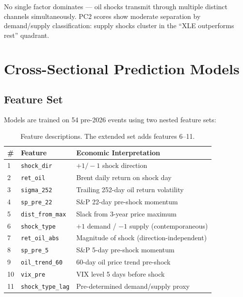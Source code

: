 \documentclass[11pt,a4paper]{article}
\begin{document}
No single factor dominates — oil shocks transmit through multiple distinct channels simultaneously. PC2 scores show moderate separation by demand/supply classification: supply shocks cluster in the ``XLE outperforms rest'' quadrant.

\section{Cross-Sectional Prediction Models}
\label{sec:models}

\subsection{Feature Set}

Models are trained on 54 pre-2026 events using two nested feature sets:

\begin{table}[H]
\centering
\caption{Feature descriptions. The extended set adds features 6–11.}
\small
\begin{tabular}{lll}
\toprule
\# & Feature & Economic Interpretation \\
\midrule
1 & \texttt{shock\_dir}       & $+1/-1$ shock direction \\
2 & \texttt{ret\_oil}         & Brent daily return on shock day \\
3 & \texttt{sigma\_252}       & Trailing 252-day oil return volatility \\
4 & \texttt{sp\_pre\_22}      & S\&P 22-day pre-shock momentum \\
5 & \texttt{dist\_from\_max}  & Slack from 3-year price maximum \\
\midrule
6 & \texttt{shock\_type}      & $+1$ demand / $-1$ supply (contemporaneous) \\
7 & \texttt{ret\_oil\_abs}    & Magnitude of shock (direction-independent) \\
8 & \texttt{sp\_pre\_5}       & S\&P 5-day pre-shock momentum \\
9 & \texttt{oil\_trend\_60}   & 60-day oil price trend pre-shock \\
10 & \texttt{vix\_pre}        & VIX level 5 days before shock \\
11 & \texttt{shock\_type\_lag}& Pre-determined demand/supply proxy \\
\bottomrule
\end{tabular}
\end{table}
\end{document}

